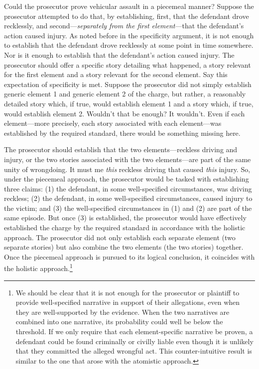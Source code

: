 \documentclass[
  10pt,
  dvipsnames,enabledeprecatedfontcommands]{scrartcl}
\begin{document}
Could the prosecutor prove vehicular assault in a piecemeal manner?
Suppose the prosecutor attempted to do that, by establishing, first,
that the defendant drove recklessly, and second---\emph{separately from
the first element}---that the defendant's action caused injury. As noted
before in the specificity argument, it is not enough to establish that
the defendant drove recklessly at some point in time somewhere. Nor is
it enough to establish that the defendant's action caused injury. The
prosecutor should offer a specific story detailing what happened, a
story relevant for the first element and a story relevant for the second
element. Say this expectation of specificity is met. Suppose the
prosecutor did not simply establish generic element 1 and generic
element 2 of the charge, but rather, a reasonably detailed story which,
if true, would establish element 1 and a story which, if true, would
establish element 2. Wouldn't that be enough? It wouldn't. Even if each
element---more precisely, each story associated with each element---was
established by the required standard, there would be something missing
here.

The prosecutor should establish that the two elements---reckless driving
and injury, or the two stories associated with the two elements---are
part of the same unity of wrongdoing. It must me \emph{this} reckless
driving that caused \emph{this} injury. So, under the piecemeal
approach, the prosecutor would be tasked with establishing three claims:
(1) the defendant, in some well-specified circumstances, was driving
reckless; (2) the defendant, in some well-specified circumstances,
caused injury to the victim; and (3) the well-specified circumstances in
(1) and (2) are part of the same episode. But once (3) is established,
the prosecutor would have effectively established the charge by the
required standard in accordance with the holistic approach. The
prosecutor did not only establish each separate element (two separate
stories) but also combine the two elements (the two stories) together.
Once the piecemeal approach is pursued to its logical conclusion, it
coincides with the holistic approach.\footnote{We should be clear that
  it is not enough for the prosecutor or plaintiff to provide
  well-specified narrative in support of their allegations, even when
  they are well-supported by the evidence. When the two narratives are
  combined into one narrative, its probability could well be below the
  threshold. If we only require that each element-specific narrative be
  proven, a defendant could be found criminally or civilly liable even
  though it is unlikely that they committed the alleged wrongful act.
  This counter-intuitive result is similar to the one that arose with
  the atomistic approach.}
\end{document}

